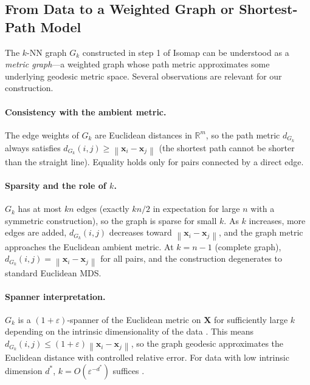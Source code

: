 \documentclass[twoside,11pt]{article}
\newcommand{\R}{\mathbb{R}}
\newcommand{\bx}{\mathbf{x}}
\newcommand{\bX}{\mathbf{X}}
\newcommand{\norm}[1]{\left\|#1\right\|}
\newcommand{\Gk}{G_k}
\begin{document}
\subsection{From Data to a Weighted Graph or Shortest-Path Model}
\label{sec:knn_graph}

The $k$-NN graph $\Gk$ constructed in step 1 of Isomap can be understood
as a \emph{metric graph}---a weighted graph whose path metric approximates
some underlying geodesic metric space.  Several observations are relevant
for our construction.

\paragraph{Consistency with the ambient metric.}
The edge weights of $\Gk$ are Euclidean distances in $\R^m$, so the path
metric $d_{\Gk}$ always satisfies $d_{\Gk}(i,j) \geq \norm{\bx_i - \bx_j}$
(the shortest path cannot be shorter than the straight line).  Equality
holds only for pairs connected by a direct edge.

\paragraph{Sparsity and the role of $k$.}
$\Gk$ has at most $kn$ edges (exactly $kn/2$ in expectation for large $n$
with a symmetric construction), so the graph is sparse for small $k$.
As $k$ increases, more edges are added, $d_{\Gk}(i,j)$ decreases toward
$\norm{\bx_i - \bx_j}$, and the graph metric approaches the Euclidean
ambient metric.  At $k = n-1$ (complete graph), $d_{\Gk}(i,j) =
\norm{\bx_i - \bx_j}$ for all pairs, and the construction degenerates to
standard Euclidean MDS.

\paragraph{Spanner interpretation.}
$\Gk$ is a $(1+\varepsilon)$-spanner of the Euclidean metric on $\bX$ for
sufficiently large $k$ depending on the intrinsic dimensionality of the
data \citep{althofer1993sparse, har-peled2006low}.  This means
$d_{\Gk}(i,j) \leq (1+\varepsilon)\norm{\bx_i - \bx_j}$, so the graph
geodesic approximates the Euclidean distance with controlled relative
error.  For data with low intrinsic dimension $d^*$, $k = O(\varepsilon^{-d^*})$
suffices \citep{har-peled2006low}.
\end{document}
